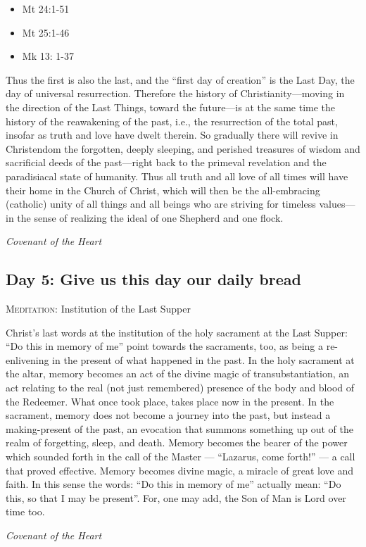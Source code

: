 \begin{itemize}
\item Mt 24:1-51 
\item Mt 25:1-46 
\item Mk 13: 1-37 
\end{itemize}
\begin{quotationx}
Thus the first is also the last, and the “first day of creation” is the Last Day, the day of universal resurrection.
Therefore the history of Christianity—moving in the direction of the Last Things, toward the
future—is at the same time the history of the reawakening of the past, i.e., the resurrection of
the total past, insofar as truth and love have dwelt therein. So gradually there will revive in Christendom the
forgotten, deeply sleeping, and perished treasures of wisdom and sacrificial deeds of the
past—right back to the primeval revelation and the paradisiacal state of humanity. Thus all truth
and all love of all times will have their home in the Church of Christ, which will then be the all-embracing (catholic)
unity of all things and all beings who are striving for timeless values—in the sense of realizing
the ideal of one Shepherd and one flock. 

\begin{flushright}\textit{Covenant of the Heart}\end{flushright}

\end{quotationx}
\subsection*{Day 5: Give us this day our daily bread}
\textsc{Meditation}: Institution of the Last Supper

\begin{quotationx}
Christ's last words at the institution of the holy sacrament at the Last Supper: “Do this in memory
of me” point towards the sacraments, too, as being a re-enlivening in the present of what happened in the past. In the
holy sacrament at the altar, memory becomes an act of the divine magic of transubstantiation, an act relating to the
real (not just remembered) presence of the body and blood of the Redeemer. What once took place, takes place now in the
present. In the sacrament, memory does not become a journey into the past, but instead a making-present of the past, an
evocation that summons something up out of the realm of forgetting, sleep, and death. Memory becomes the bearer of the
power which sounded forth in the call of the Master — “Lazarus, come forth!”
— a call that proved effective. Memory becomes divine magic, a miracle of great love and faith. In
this sense the words: “Do this in memory of me” actually mean: “Do this, so that I may be present”. For, one may add,
the Son of Man is Lord over time too. 

\begin{flushright}\textit{Covenant of the Heart}\end{flushright}

\end{quotationx}

